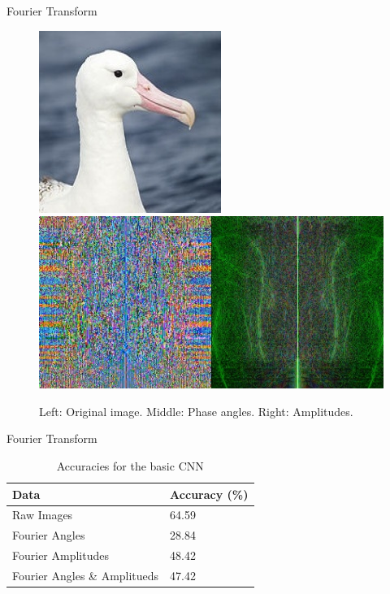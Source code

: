 \documentclass[a4paper,10pt]{beamer}
\begin{document}
\begin{frame}{Fourier Transform}

\begin{figure}[!htb]
	\raggedleft
	\includegraphics[scale=0.33]{fourier1}
	\endminipage
	\raggedleft
	\includegraphics[trim=0cm 0cm 0cm 0cm, scale=0.33]{fourier2}
	\endminipage
	\caption{Left: Original image. Middle: Phase angles. Right: Amplitudes.}
\end{figure}	
\end{frame}

\begin{frame}{Fourier Transform}

\begin{table}[H]
  \caption{Accuracies for the basic CNN}
  \label{sample-table}
  \begin{tabular}{ll}
    Data & Accuracy (\%) \\
    \hline
    Raw Images  & 64.59 \\
    Fourier Angles & 28.84   \\
    Fourier Amplitudes & 48.42 \\
    Fourier Angles \& Amplitueds & 47.42 \\
    \hline
  \end{tabular}
\end{table}

\end{frame}
\end{document}

